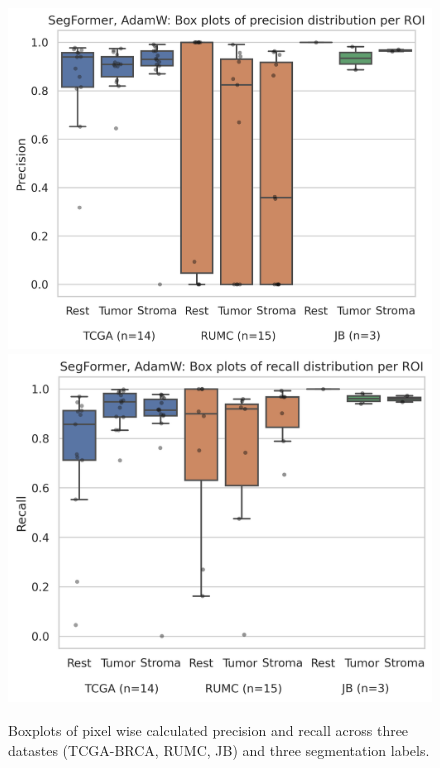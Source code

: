 \begin{figure}[H]
\includegraphics[width=.5\linewidth]{figures/tissue/segformer,_adamw_prec_roi_wsirois.png}
\includegraphics[width=.5\linewidth]{figures/tissue/segformer,_adamw_recall_roi_wsirois.png}
\caption{Boxplots of pixel wise calculated precision and recall across three datastes (TCGA-BRCA, RUMC, JB) and three segmentation labels.}
\label{fig:tissue_pr_r_boxplots}
\end{figure}

